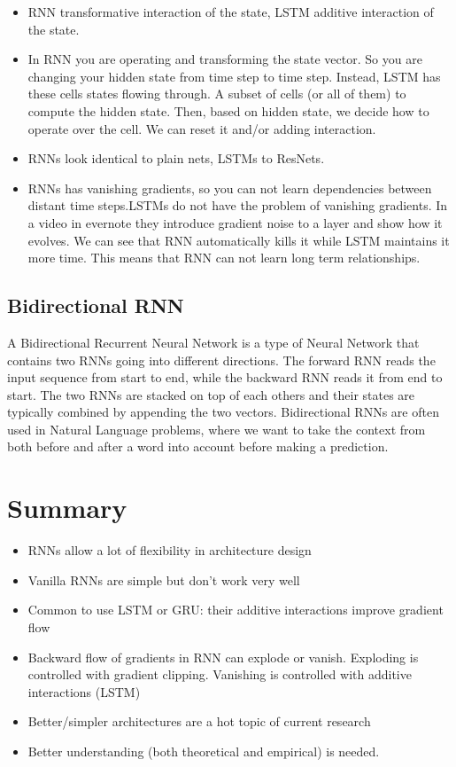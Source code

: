 \begin{itemize}
\item RNN transformative interaction of the state, LSTM additive interaction of the state.
\item In RNN you are operating and transforming the state vector. So you are changing your hidden state from time step to time step. Instead, LSTM has these cells states flowing through. A subset of cells (or all of them) to compute the hidden state. Then, based on hidden state, we decide how to operate over the cell. We can reset it and/or adding interaction.
\item RNNs look identical to plain nets, LSTMs to ResNets.
\item RNNs has vanishing gradients, so you can not learn dependencies between distant time steps.LSTMs do not have the problem of vanishing gradients. In a video in evernote they introduce gradient noise to a layer and show how it evolves. We can see that RNN automatically kills it while LSTM maintains it more time. This means that RNN can not learn long term relationships.
\end{itemize}

\subsection{Bidirectional RNN}
A Bidirectional Recurrent Neural Network is a type of Neural Network that contains two RNNs going into different directions. The forward RNN reads the input sequence from start to end, while the backward RNN reads it from end to start. The two RNNs are stacked on top of each others and their states are typically combined by appending the two vectors. Bidirectional RNNs are often used in Natural Language problems, where we want to take the context from both before and after a word into account before making a prediction.


\section*{Summary}
\begin{itemize}
\item RNNs allow a lot of flexibility in architecture design
\item Vanilla RNNs are simple but don’t work very well
\item Common to use LSTM or GRU: their additive interactions improve gradient flow
\item Backward flow of gradients in RNN can explode or vanish. Exploding is controlled with gradient clipping. Vanishing is controlled with additive interactions (LSTM)
\item Better/simpler architectures are a hot topic of current research
\item Better understanding (both theoretical and empirical) is needed.
\end{itemize}


 